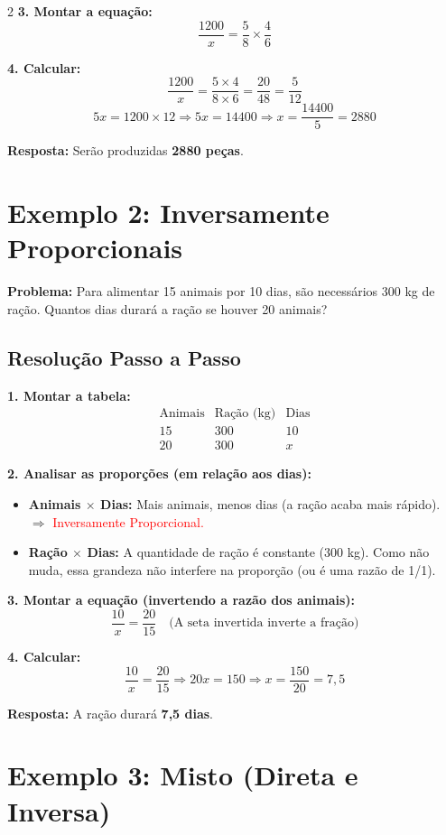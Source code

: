 \documentclass[11pt]{article}
\begin{document}
\begin{multicols}{2}
\textbf{3. Montar a equação:}
\[
\frac{1200}{x} = \frac{5}{8} \times \frac{4}{6}
\]

\textbf{4. Calcular:}
\[
\frac{1200}{x} = \frac{5 \times 4}{8 \times 6} = \frac{20}{48} = \frac{5}{12}
\]
\[
5x = 1200 \times 12 \Rightarrow 5x = 14400 \Rightarrow x = \frac{14400}{5} = 2880
\]

\textbf{Resposta:} Serão produzidas \textbf{2880 peças}.

\section*{Exemplo 2: Inversamente Proporcionais}

\textbf{Problema:} Para alimentar 15 animais por 10 dias, são necessários 300 kg de ração. Quantos dias durará a ração se houver 20 animais?

\subsection*{Resolução Passo a Passo}

\textbf{1. Montar a tabela:}
\[
\begin{array}{c|c|c}
\text{Animais} & \text{Ração (kg)} & \text{Dias} \\
\hline
15 & 300 & 10 \\
20 & 300 & x
\end{array}
\]

\textbf{2. Analisar as proporções (em relação aos dias):}
\begin{itemize}
    \item \textbf{Animais $\times$ Dias:} Mais animais, menos dias (a ração acaba mais rápido). $\Rightarrow$ \textcolor{red}{Inversamente Proporcional.}
    \item \textbf{Ração $\times$ Dias:} A quantidade de ração é constante (300 kg). Como não muda, essa grandeza não interfere na proporção (ou é uma razão de 1/1).
\end{itemize}

\textbf{3. Montar a equação (invertendo a razão dos animais):}
\[
\frac{10}{x} = \frac{20}{15} \quad \text{(A seta invertida inverte a fração)}
\]

\textbf{4. Calcular:}
\[
\frac{10}{x} = \frac{20}{15} \Rightarrow 20x = 150 \Rightarrow x = \frac{150}{20} = 7,5
\]

\textbf{Resposta:} A ração durará \textbf{7,5 dias}.

\section*{Exemplo 3: Misto (Direta e Inversa)}


\end{multicols}
\end{document}
